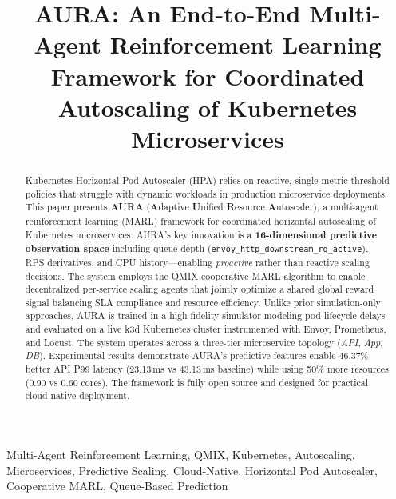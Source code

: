 \documentclass[conference]{IEEEtran}
\begin{document}
\title{AURA: An End-to-End Multi-Agent Reinforcement Learning
Framework for Coordinated Autoscaling of Kubernetes Microservices}


\author{
}

\maketitle

\begin{abstract}
Kubernetes Horizontal Pod Autoscaler (HPA) relies on reactive,
single-metric threshold policies that struggle with dynamic workloads
in production microservice deployments. This paper presents
\textbf{AURA} (\textbf{A}daptive \textbf{U}nified \textbf{R}esource
\textbf{A}utoscaler), a multi-agent reinforcement learning (MARL)
framework for coordinated horizontal autoscaling of Kubernetes
microservices. AURA's key innovation is a \textbf{16-dimensional
predictive observation space} including queue depth
(\texttt{envoy\_http\_downstream\_rq\_active}), RPS derivatives, and
CPU history---enabling \emph{proactive} rather than reactive scaling
decisions. The system employs the QMIX cooperative MARL algorithm to
enable decentralized per-service scaling agents that jointly optimize
a shared global reward signal balancing SLA compliance and resource
efficiency. Unlike prior simulation-only approaches, AURA is trained
in a high-fidelity simulator modeling pod lifecycle delays and
evaluated on a live k3d Kubernetes cluster instrumented with Envoy,
Prometheus, and Locust. The system operates across a three-tier
microservice topology (\textit{API}, \textit{App}, \textit{DB}).
Experimental results demonstrate AURA's predictive features enable
46.37\% better API P99 latency (23.13\,ms vs 43.13\,ms baseline) while
using 50\% more resources (0.90 vs 0.60 cores). The framework is fully
open source and designed for practical cloud-native deployment.
\end{abstract}

\begin{IEEEkeywords}
Multi-Agent Reinforcement Learning, QMIX, Kubernetes, Autoscaling,
Microservices, Predictive Scaling, Cloud-Native, Horizontal Pod
Autoscaler, Cooperative MARL, Queue-Based Prediction
\end{IEEEkeywords}
\end{document}
